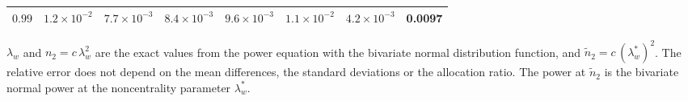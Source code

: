 \begin{table}[ht]
\begin{threeparttable}
\begin{tabular}{rrrrrrrr}
$0.99$ & $1.2 \times 10^{-2}$ & $7.7 \times 10^{-3}$ & $8.4 \times 10^{-3}$ & $9.6 \times 10^{-3}$ & $1.1 \times 10^{-2}$ & $4.2 \times 10^{-3}$ & 0.0097 \\
\hline
\end{tabular}
\begin{tablenotes}
\footnotesize
\item[] $\lambda_w$ and $n_2 = c\,\lambda_w^2$ are the exact values from the power equation with the bivariate normal distribution function, and $\tilde n_2 = c\,(\lambda_w^{*})^2$. The relative error does not depend on the mean differences, the standard deviations or the allocation ratio. The power at $\tilde n_2$ is the bivariate normal power at the noncentrality parameter $\lambda_w^{*}$.
\end{tablenotes}
\end{threeparttable}
\end{table}
